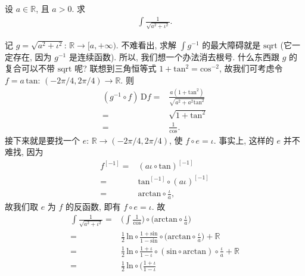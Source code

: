 \begin{example}
    设 $a \in \mathbb{R}$, 且 $a > 0$.
    求
    \begin{align*}
        \int {\frac{1}{\sqrt{a^2 + \iota^2}}}.
    \end{align*}

    记 $g = \sqrt{a^2 + \iota^2}$: $\mathbb{R} \to [a, +\infty)$.
    不难看出, 求解 $\int {g^{-1}}$ 的最大障碍就是
    $\mathrm{sqrt}$
    (它一定存在, 因为 $g^{-1}$ 是连续函数).
    所以, 我们想一个办法消去根号.
    什么东西跟 $g$ 的复合可以不带 $\mathrm{sqrt}$ 呢?
    联想到三角恒等式 $1 + \mathrm{tan}^2 = \mathrm{cos}^{-2}$,
    故我们可考虑令
    $f = a\,\mathrm{tan}$: $(-2\pi/4, 2\pi/4) \to \mathbb{R}$.
    则
    \begin{align*}
        (g^{-1} \circ f)\,\mathrm{D}f
        = {} & \frac{a (1 + \mathrm{tan}^2)}{\sqrt{a^2 + a^2 \mathrm{tan}^2}} \\
        = {} & \sqrt{1 + \mathrm{tan}^2}                                      \\
        = {} & \frac{1}{\mathrm{cos}}.
    \end{align*}
    接下来就是要找一个 $e$: $\mathbb{R} \to (-2\pi/4, 2\pi/4)$,
    使 $f \circ e = \iota$.
    事实上, 这样的 $e$ 并不难找, 因为
    \begin{align*}
        f^{[-1]}
        = {} & (a\iota \circ \mathrm{tan})^{[-1]}        \\
        = {} & \mathrm{tan}^{[-1]} \circ (a\iota)^{[-1]} \\
        = {} & \mathrm{arctan} \circ \frac{\iota}{a},
    \end{align*}
    故我们取 $e$ 为 $f$ 的反函数, 即有 $f \circ e = \iota$.
    故
    \begin{align*}
        \int {\frac{1}{\sqrt{a^2 + \iota^2}}}
        = {} & \Bigg( \int {\frac{1}{\mathrm{cos}}} \Bigg) \circ
        \Bigg( \mathrm{arctan} \circ \frac{\iota}{a} \Bigg)                     \\
        = {} & \frac{1}{2}\,\mathrm{ln} \circ
        \frac{1 + \mathrm{sin}}{1 - \mathrm{sin}} \circ
        \Bigg( \mathrm{arctan} \circ \frac{\iota}{a} \Bigg) + \mathbb{R}        \\
        = {} & \frac{1}{2}\,\mathrm{ln} \circ \frac{1 + \iota}{1 - \iota} \circ
        (\mathrm{sin} \circ \mathrm{arctan}) \circ \frac{\iota}{a}
        + \mathbb{R}                                                            \\
        = {} & \frac{1}{2}\,\mathrm{ln} \circ \Bigg(\frac{1 + \iota}{1 - \iota}

\end{align*}
\end{example}
